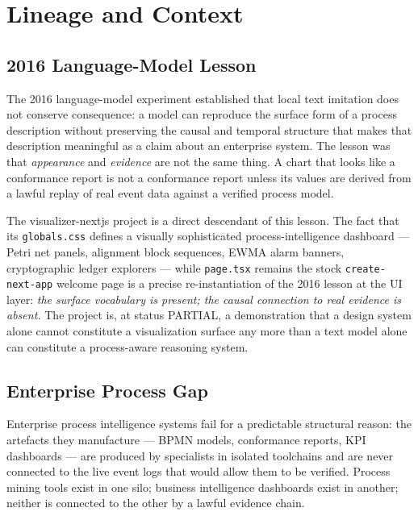 
\section{Lineage and Context}
\label{sec:experiments-visualizer-nextjs-lineage}

\subsection{2016 Language-Model Lesson}
\label{sec:experiments-visualizer-nextjs-lineage-2016}

The 2016 language-model experiment established that local text imitation does not conserve
consequence: a model can reproduce the surface form of a process description without preserving
the causal and temporal structure that makes that description meaningful as a claim about an
enterprise system. The lesson was that \emph{appearance} and \emph{evidence} are not the same
thing. A chart that looks like a conformance report is not a conformance report unless its
values are derived from a lawful replay of real event data against a verified process model.

The visualizer-nextjs project is a direct descendant of this lesson. The fact that its
\texttt{globals.css} defines a visually sophisticated process-intelligence dashboard --- Petri
net panels, alignment block sequences, EWMA alarm banners, cryptographic ledger explorers ---
while \texttt{page.tsx} remains the stock \texttt{create-next-app} welcome page is a precise
re-instantiation of the 2016 lesson at the UI layer: \emph{the surface vocabulary is present;
the causal connection to real evidence is absent.} The project is, at status PARTIAL, a
demonstration that a design system alone cannot constitute a visualization surface any more
than a text model alone can constitute a process-aware reasoning system.

\subsection{Enterprise Process Gap}
\label{sec:experiments-visualizer-nextjs-lineage-enterprise-gap}

Enterprise process intelligence systems fail for a predictable structural reason: the artefacts
they manufacture --- BPMN models, conformance reports, KPI dashboards --- are produced by
specialists in isolated toolchains and are never connected to the live event logs that would
allow them to be verified. Process mining tools exist in one silo; business intelligence
dashboards exist in another; neither is connected to the other by a lawful evidence chain.

